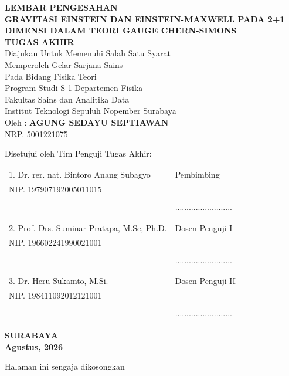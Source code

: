 \begin{center}
\large{\textbf{LEMBAR PENGESAHAN}} \\
\vspace{4mm}
\textbf{GRAVITASI EINSTEIN DAN EINSTEIN-MAXWELL PADA 2+1 DIMENSI DALAM TEORI GAUGE CHERN-SIMONS} \\
\vspace{4mm}
\textbf{TUGAS AKHIR} \\
\vspace{4mm}
Diajukan Untuk Memenuhi Salah Satu Syarat \\
Memperoleh Gelar Sarjana Sains \\
Pada Bidang Fisika Teori \\
Program Studi S-1 Departemen Fisika \\
Fakultas Sains dan Analitika Data\\
Institut Teknologi Sepuluh Nopember Surabaya \\
\vspace{4mm}
Oleh : \textbf{AGUNG SEDAYU SEPTIAWAN} \\
\vspace{1mm}
NRP. 5001221075 \\
\vspace{4mm}
\begin{center}
    Disetujui oleh Tim Penguji Tugas Akhir:
\end{center}

\vspace{4ex}

\begingroup
\setlength{\tabcolsep}{0pt}

\noindent
\begin{tabularx}{\textwidth}{X l}
    1. Dr. rer. nat. Bintoro Anang Subagyo      & Pembimbing \\
    NIP. 197907192005011015                      &  \\
    &  \\
    &.........................  \\
    &  \\
    &  \\
    2. Prof. Drs. Suminar Pratapa, M.Sc, Ph.D.  & Dosen Penguji I \\
    NIP. 196602241990021001  & \\
        &  \\
    & ......................... \\
        &  \\
    &  \\
    3. Dr. Heru Sukamto, M.Si. & Dosen Penguji II \\
    NIP. 198411092012121001   &  \\
    &  \\
        & .........................\\
\end{tabularx}
\endgroup
  \begin{center}
    \textbf{SURABAYA\\Agustus, 2026}
\end{center}
\end{center}

\newpage
\thispagestyle{empty}
\vspace*{\fill}
    \begin{center}
    Halaman ini sengaja dikosongkan
    \end{center}
\vspace*{\fill}
\pagebreak